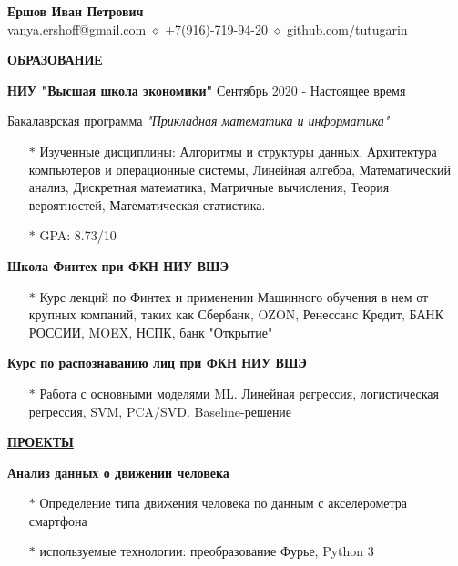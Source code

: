 \documentclass[11pt]{article}
\begin{document}
\begin{center}
\thispagestyle{empty}
\large \textbf{Ершов Иван Петрович \\}    
\normalsize vanya.ershoff@gmail.com $\diamond$ +7(916)-719-94-20 $\diamond$ github.com/tutugarin   \\
\hrulefill
\end{center}

\noindent \textbf{\underline{ОБРАЗОВАНИЕ}} \\
\par \textbf{НИУ "Высшая школа экономики"} \hfill Сентябрь 2020 - Настоящее время
\par Бакалаврская программа \textit{"Прикладная математика и информатика" } 
\begin{itemize}
\item[$\ast$] Изученные дисциплины: Алгоритмы и структуры данных, Архитектура компьютеров и операционные системы, Линейная алгебра, Математический анализ, Дискретная математика, Матричные вычисления, Теория вероятностей, Математическая статистика.

\item[$\ast$] GPA: 8.73/10
\end{itemize}
\par \textbf{Школа Финтех при ФКН НИУ ВШЭ}
\begin{itemize}
\item[$\ast$] Курс лекций по Финтех и применении Машинного обучения в нем от крупных компаний, таких как Сбербанк, OZON, Ренессанс Кредит, БАНК РОССИИ, MOEX, НСПК, банк "Открытие"
\end{itemize}

\par \textbf{Курс по распознаванию лиц при ФКН НИУ ВШЭ}
\begin{itemize}
\item[$\ast$] Работа с основными моделями ML. Линейная регрессия, логистическая регрессия, SVM, PCA/SVD. Baseline-решение
\end{itemize}

\noindent \textbf{\underline{ПРОЕКТЫ}} \\
\par \textbf{Анализ данных о движении человека}
\begin{itemize}
\item[$\ast$] Определение типа движения человека по данным с акселерометра смартфона
\item[$\ast$] используемые технологии: преобразование Фурье, Python 3
\end{itemize}
\end{document}
